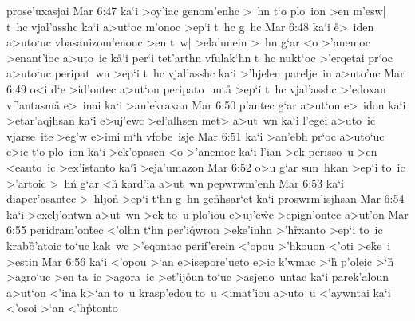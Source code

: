 prose'uxasjai\bibvsend
\vs Mar 6:47
ka`i
>oy'iac
genom'enhc
>~hn
t`o
plo~ion
>en
m'esw|
t~hc
vjal'asshc
ka`i
a>ut`oc
m'onoc
>ep`i
t~hc
g~hc\bibvsend
\vs Mar 6:48
ka`i
\r{e}>~iden
a>uto`uc
vbasanizom'enouc
>en
t~w|
>ela'unein
>~hn
g`ar
<o
>'anemoc
>enant'ioc
a>uto~ic
k\r{a}`i
per`i
tet'arthn
vfulak`hn
t~hc
nukt`oc
>'erqetai
pr`oc
a>uto`uc
peripat~wn
>ep`i
t~hc
vjal'asshc
ka`i
>'hjelen
parelje~in
a>uto'uc\bibvsend
\vs Mar 6:49
o<i
d`e
>id'ontec
a>ut`on
peripato~unta\r{}
>ep`i
t~hc
vjal'asshc
>'edoxan
vf'antasma\r{}
e>~inai
ka`i
>an'ekraxan\bibvsend
\vs Mar 6:50
p'antec
g`ar
a>ut`on
e>~idon
ka`i
>etar'aqjhsan
ka`i\r{}
e>uj'ewc
>el'alhsen
met>
a>ut~wn
ka`i
l'egei
a>uto~ic
vjarse~ite
>eg'w
e>imi
m`h
vfobe~isje\bibvsend
\vs Mar 6:51
ka`i
>an'ebh
pr`oc
a>uto`uc
e>ic
t`o
plo~ion
ka`i
>ek'opasen
<o
>'anemoc
ka`i
l'ian
>ek
perisso~u
>en
<eauto~ic
>ex'istanto
ka`i\r{}
>eja'umazon\bibvsend
\vs Mar 6:52
o>u
g`ar
sun~hkan
>ep`i
to~ic
>'artoic
>~hn\r{}
g`ar
<h\r{}
kard'ia
a>ut~wn
pepwrwm'enh\bibvsend
\vs Mar 6:53
ka`i
diaper'asantec
>~hljon\r{}
>ep`i
t`hn
g~hn
ge\r{n}hsar`et
ka`i
proswrm'isjhsan\bibvsend
\vs Mar 6:54
ka`i
>exelj'ontwn
a>ut~wn
>ek
to~u
plo'iou
e>uj'e\r{w}c
>epign'ontec
a>ut'on\bibvsend
\vs Mar 6:55
peridram'on\r{t}ec
<'olhn
t`hn
per'i\r{q}wron
>eke'inhn
>'h\r{r}xanto
>ep`i
to~ic
krab\r{b}'atoic
to`uc
kak~wc
>'eqontac
perif'erein
<'opou
>'hkouon
<'oti
>e\r{k}e~i
>estin\bibvsend
\vs Mar 6:56
ka`i
<'opou
>`an
e>isepore'ueto
e>ic
k'wmac
>`h\r{}
p'oleic
>`h\r{}
>agro`uc
>en
ta~ic
>agora~ic
>et'ij\r{o}un
to`uc
>asjeno~untac
ka`i
parek'aloun
a>ut`on
<'ina
k>`an
to~u
krasp'edou
to~u
<imat'iou
a>uto~u
<'aywntai
ka`i
<'osoi
>`an
<'h\r{p}tonto
